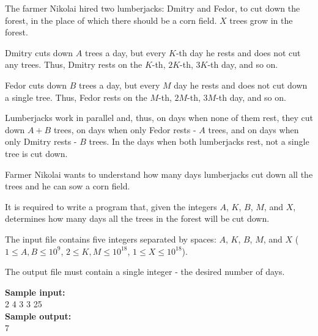 \documentclass[a4paper]{article}
\begin{document}
The farmer Nikolai hired two lumberjacks: Dmitry and Fedor, to cut down the forest, in the place of which there should be a corn field. $X$ trees grow in the forest.

Dmitry cuts down $A$ trees a day, but every $K$-th day he rests and does not cut any trees. Thus, Dmitry rests on the $K$-th, $2K$-th, $3K$-th day, and so on.

Fedor cuts down $B$ trees a day, but every $M$ day he rests and does not cut down a single tree. Thus, Fedor rests on the $M$-th, $2M$-th, $3M$-th day, and so on.

Lumberjacks work in parallel and, thus, on days when none of them rest, they cut down $A + B$ trees, on days when only Fedor rests - $A$ trees, and on days when only Dmitry rests - $B$ trees. In the days when both lumberjacks rest, not a single tree is cut down.

Farmer Nikolai wants to understand how many days lumberjacks cut down all the trees and he can sow a corn field.

It is required to write a program that, given the integers $A$, $K$, $B$, $M$, and $X$, determines how many days all the trees in the forest will be cut down.

The input file contains five integers separated by spaces: $A$, $K$, $B$, $M$, and $X$ ($1 \le A, B \le 10^9$, $2 \le K, M \le 10^{18}$, $1 \le X \le 10^{18}$).

The output file must contain a single integer - the desired number of days.

\LINE

\noindent \textbf{Sample input:}\\
2 4 3 3 25\\

\noindent \textbf{Sample output:}\\
7
\end{document}

